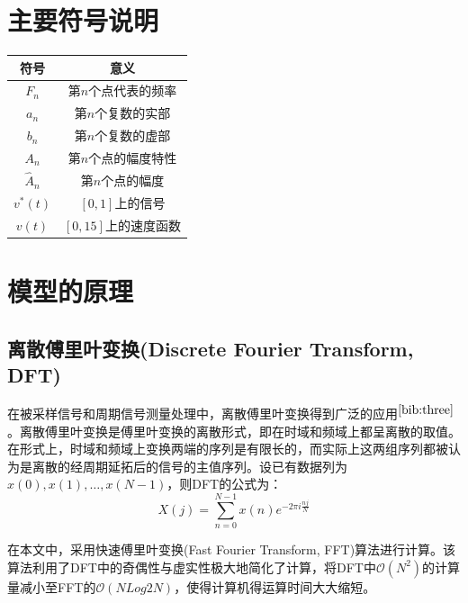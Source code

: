 \documentclass[bwprint]{cumcmthesis}
\begin{document}
    \section{主要符号说明}
        \begin{center}
            \begin{tabular}{cc}
                \hline
                符号	&  意义 \\ \hline
                $F_n$ & 第$n$个点代表的频率 \\ 
                $a_n$ & 第$n$个复数的实部 \\ 
                $b_n$ & 第$n$个复数的虚部 \\ 
                $A_n$ & 第$n$个点的幅度特性 \\ 
                $\widehat{A}_n$ & 第$n$个点的幅度 \\ 
                $v^*(t)$ & $[0,1]$上的信号 \\ 
                $v(t)$ & $[0,15]$上的速度函数 \\
                \hline
            \end{tabular}
        \end{center}
    \section{模型的原理}
        \subsection{离散傅里叶变换(Discrete Fourier Transform, DFT)}
        在被采样信号和周期信号测量处理中，离散傅里叶变换得到广泛的应用$^{\cite{bib:three}}$。离散傅里叶变换是傅里叶变换的离散形式，即在时域和频域上都呈离散的取值。在形式上，时域和频域上变换两端的序列是有限长的，而实际上这两组序列都被认为是离散的经周期延拓后的信号的主值序列。设已有数据列为$x(0),x(1),\dots,x(N-1)$，则DFT的公式为：
        \begin{equation}
            \label{eq:DFT}
            X(j) = \sum_{n=0}^{N-1}x(n)e^{-2\pi i\frac{nj}{N}}
        \end{equation}
        
        在本文中，采用快速傅里叶变换(Fast Fourier Transform, FFT)算法进行计算。该算法利用了DFT中的奇偶性与虚实性极大地简化了计算，将DFT中$\mathcal{O}(N^2)$的计算量减小至FFT的$\mathcal{O}(NLog2N)$，使得计算机得运算时间大大缩短。
\end{document}
